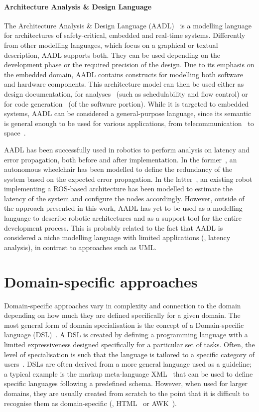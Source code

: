 \paragraph{Architecture Analysis \& Design Language} The  Architecture Analysis \& Design Language (AADL)~\cite{feiler2006architecture} is a modelling language for architectures of safety-critical, embedded and real-time systems. Differently from other modelling languages, which focus on a graphical or textual description, AADL supports both. They can be used depending on the development phase or the required precision of the design. Due to its emphasis on the embedded domain, AADL contains constructs for modelling both software and hardware components. This architecture model can then be used either as design documentation, for analyses~\cite{feiler2004open} (such as schedulability and flow control) or for code generation~\cite{hugues2008prototype} (of the software portion). While it is targeted to embedded systems, AADL can be considered a general-purpose language, since its semantic is general enough to be used for various applications, from telecommunication~\cite{delanote2008using} to space~\cite{perrotin2011taste}.

AADL has been successfully used in robotics to perform analysis on latency and error propagation, both before and after implementation. In the former~\cite{biggs2014modelling}, an autonomous wheelchair has been modelled to define the redundancy of the system based on the expected error propagation. In the latter~\cite{larsen2016modelling}, an existing robot implementing a ROS-based architecture has been modelled to estimate the latency of the system and configure the nodes accordingly. However, outside of the approach presented in this work, AADL has yet to be used as a modelling language to describe robotic architectures and as a support tool for the entire development process. This is probably related to the fact that AADL is considered a niche modelling language with limited applications (\eg, latency analysis), in contrast to approaches such as UML.

\section{Domain-specific approaches}
Domain-specific approaches vary in complexity and connection to the domain depending on how much they are defined specifically for a given domain. The most general form of domain specialisation is the concept of a Domain-specific language (DSL)~\cite{fowler2010domain}.  A DSL is created by defining a programming language with a limited expressiveness designed specifically for a particular set of tasks. Often, the level of specialisation is such that the language is tailored to a specific category of users~\cite{voelter2013dsl}. DSLs are often derived from a more general language used as a guideline; a typical example is the markup meta-language XML~\cite{harold1998xml} that can be used to define specific languages following a predefined schema. However, when used for larger domains, they are usually created from scratch to the point that it is difficult to recognise them as domain-specific (\eg, HTML~\cite{graham1995html} or AWK~\cite{dougherty1997sed}).

